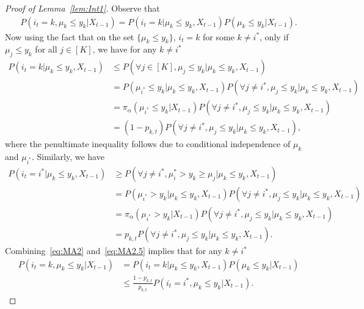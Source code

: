 \documentclass[11pt]{article}
\begin{document}
\begin{proof}[Proof of Lemma~\ref{lem:Int1}]
Observe that 
\begin{align}
     P( i_t=k,\mu_k\leq y_k  | X_{t-1}) = P(i_t=k | \mu_k\leq y_k , X_{t-1} ) P(\mu_k\leq y_k| X_{t-1}).
\end{align}
Now using the fact that on the set $\{\mu_k\leq y_k\}$, $i_t=k$ for some $k\neq i^*$, only if $\mu_j \leq y_k$ for all $j\in[K]$, we have for any $k\neq i^*$
\begin{align}
\nonumber
P(i_t=k | \mu_k\leq y_k , X_{t-1} ) &\leq P(\forall j \in [K], \mu_j \leq y_k  | \mu_k\leq y_k , X_{t-1} )
\\
\nonumber
&= P(\mu_{i^*} \leq y_k  | \mu_k\leq y_k , X_{t-1} ) P(\forall j \neq i^*, \mu_j \leq y_k  | \mu_k\leq y_k , X_{t-1} )
\\
\nonumber
&= \pi_{\alpha}(\mu_{i^*} \leq y_k  | X_{t-1} ) P(\forall j \neq i^*, \mu_j \leq y_k  | \mu_k\leq y_k , X_{t-1} )
\\
&= ( 1-p_{k,t} ) P(\forall j \neq i^*, \mu_j \leq y_k  | \mu_k\leq y_k , X_{t-1} ),
\label{eq:MA2}
\end{align}
where the penultimate inequality follows due to conditional independence of $\mu_k$ and $\mu_{i^*}$. Similarly, we have 
\begin{align}
\nonumber
P(i_t=i^* | \mu_k\leq y_k , X_{t-1} ) &\geq P(\forall j \neq i^*, \mu_i^* > y_k \geq \mu_j  | \mu_k\leq y_k , X_{t-1} )
\\
\nonumber
&= P(\mu_{i^*} > y_k  | \mu_k\leq y_k , X_{t-1} ) P(\forall j \neq i^*, \mu_j \leq y_k  | \mu_k\leq y_k , X_{t-1} )
\\
\nonumber
&= \pi_{\alpha}(\mu_{i^*} > y_k  | X_{t-1} ) P(\forall j \neq i^*, \mu_j \leq y_k  | \mu_k\leq y_k , X_{t-1} )
\\
&= p_{k,t} P(\forall j \neq i^*, \mu_j \leq y_k  | \mu_k\leq y_k , X_{t-1} ).
\label{eq:MA2.5}
\end{align}
Combining~\eqref{eq:MA2} and~\eqref{eq:MA2.5} implies that for any $k\neq i^*$
\begin{align*}
P(i_t=k , \mu_k\leq y_k | X_{t-1} ) &= P(i_t=k | \mu_k\leq y_k , X_{t-1} )P(\mu_k\leq y_k| X_{t-1})  
\\
&\leq  \frac{1-p_{k,t}}{p_{k,t}} P(i_t=i^* , \mu_k\leq y_k | X_{t-1} ).
\end{align*}
\end{proof}
\end{document}
